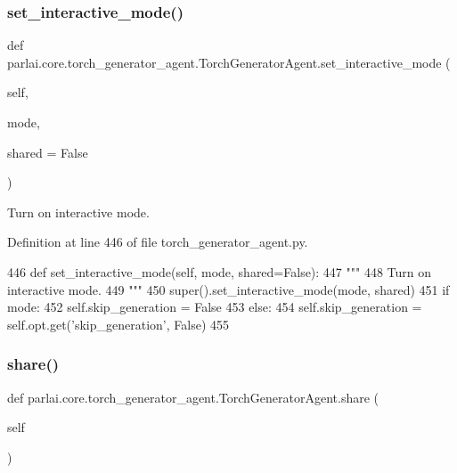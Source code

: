 \subsubsection{\texorpdfstring{set\+\_\+interactive\+\_\+mode()}{set\_interactive\_mode()}}
{\footnotesize\ttfamily def parlai.\+core.\+torch\+\_\+generator\+\_\+agent.\+Torch\+Generator\+Agent.\+set\+\_\+interactive\+\_\+mode (\begin{DoxyParamCaption}\item[{}]{self,  }\item[{}]{mode,  }\item[{}]{shared = {\ttfamily False} }\end{DoxyParamCaption})}

\begin{DoxyVerb}Turn on interactive mode.
\end{DoxyVerb}
 

Definition at line 446 of file torch\+\_\+generator\+\_\+agent.\+py.


\begin{DoxyCode}
446     \textcolor{keyword}{def }set\_interactive\_mode(self, mode, shared=False):
447         \textcolor{stringliteral}{"""}
448 \textcolor{stringliteral}{        Turn on interactive mode.}
449 \textcolor{stringliteral}{        """}
450         super().set\_interactive\_mode(mode, shared)
451         \textcolor{keywordflow}{if} mode:
452             self.skip\_generation = \textcolor{keyword}{False}
453         \textcolor{keywordflow}{else}:
454             self.skip\_generation = self.opt.get(\textcolor{stringliteral}{'skip\_generation'}, \textcolor{keyword}{False})
455 
\end{DoxyCode}
\mbox{\label{classparlai_1_1core_1_1torch__generator__agent_1_1TorchGeneratorAgent_ad10e64dd33f1add04ba5bcf36b86c2bf}} 
\subsubsection{\texorpdfstring{share()}{share()}}
{\footnotesize\ttfamily def parlai.\+core.\+torch\+\_\+generator\+\_\+agent.\+Torch\+Generator\+Agent.\+share (\begin{DoxyParamCaption}\item[{}]{self }\end{DoxyParamCaption})}

